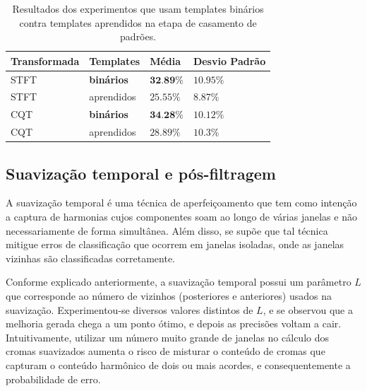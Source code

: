         \begin{table}[h]
        \centering
        \begin{tabular}{|l|l|l|l|}
            \hline
        
            \textbf{Transformada} & \textbf{Templates} & \textbf{Média} & \textbf{Desvio Padrão} \\
        
            \hline

            STFT  & \textbf{binários}   & $\textbf{{32.89}\%}$ & ${10.95}\%$  \\
            STFT  & aprendidos & ${25.55}\%$ & ${8.87}\%$ \\

            \hline

            CQT   & \textbf{binários}   & $\textbf{{34.28}\%}$ & ${10.12}\%$ \\
            CQT   & aprendidos & ${28.89}\%$ & ${10.3}\%$  \\
        
        
            \hline
        \end{tabular}
        \caption{Resultados dos experimentos que usam templates binários contra templates aprendidos na etapa de casamento de padrões.}
        \label{tabela:bin-vs-learn}
        \end{table}
    
    \subsection{Suavização temporal e pós-filtragem}
    
        A suavização temporal é uma técnica de aperfeiçoamento que tem como intenção a captura de harmonias cujos componentes soam ao longo de várias janelas e não necessariamente de forma simultânea. Além disso, se supõe que tal técnica mitigue erros de classificação que ocorrem em janelas isoladas, onde as janelas vizinhas são classificadas corretamente.
        
        Conforme explicado anteriormente, a suavização temporal possui um parâmetro $L$ que corresponde ao número de vizinhos (posteriores e anteriores) usados na suavização. Experi\-mentou-se diversos valores distintos de $L$, e se observou que a melhoria gerada chega a um ponto ótimo, e depois as precisões voltam a cair. Intuitivamente, utilizar um número muito grande de janelas no cálculo dos cromas suavizados aumenta o risco de misturar o conteúdo de cromas que capturam o conteúdo harmônico de dois ou mais acordes, e consequentemente a probabilidade de erro.
        

